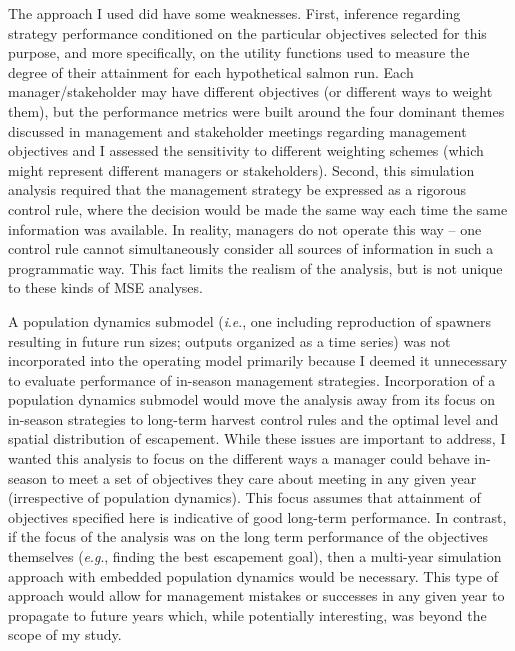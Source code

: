 \documentclass[12pt,]{book}
\theoremstyle{definition}
\theoremstyle{definition}
\theoremstyle{definition}
\theoremstyle{remark}
\begin{document}
The approach I used did have some weaknesses. First, inference regarding
strategy performance conditioned on the particular objectives selected
for this purpose, and more specifically, on the utility functions used
to measure the degree of their attainment for each hypothetical salmon
run. Each manager/stakeholder may have different objectives (or
different ways to weight them), but the performance metrics were built
around the four dominant themes discussed in management and stakeholder
meetings regarding management objectives and I assessed the sensitivity
to different weighting schemes (which might represent different managers
or stakeholders). Second, this simulation analysis required that the
management strategy be expressed as a rigorous control rule, where the
decision would be made the same way each time the same information was
available. In reality, managers do not operate this way -- one control
rule cannot simultaneously consider all sources of information in such a
programmatic way. This fact limits the realism of the analysis, but is
not unique to these kinds of MSE analyses.

A population dynamics submodel (\emph{i}.\emph{e}., one including
reproduction of spawners resulting in future run sizes; outputs
organized as a time series) was not incorporated into the operating
model primarily because I deemed it unnecessary to evaluate performance
of in-season management strategies. Incorporation of a population
dynamics submodel would move the analysis away from its focus on
in-season strategies to long-term harvest control rules and the optimal
level and spatial distribution of escapement. While these issues are
important to address, I wanted this analysis to focus on the different
ways a manager could behave in-season to meet a set of objectives they
care about meeting in any given year (irrespective of population
dynamics). This focus assumes that attainment of objectives specified
here is indicative of good long-term performance. In contrast, if the
focus of the analysis was on the long term performance of the objectives
themselves (\emph{e}.\emph{g}., finding the best escapement goal), then
a multi-year simulation approach with embedded population dynamics would
be necessary. This type of approach would allow for management mistakes
or successes in any given year to propagate to future years which, while
potentially interesting, was beyond the scope of my study.
\end{document}
